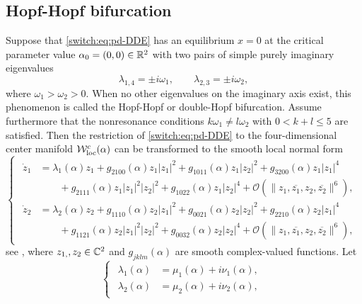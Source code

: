 \subsection{Hopf-Hopf bifurcation}
\label{switch:sec:HH_coef}
Suppose that \cref{switch:eq:pd-DDE} has an equilibrium $x=0$ at the critical parameter value $\alpha_{0}=(0,0)\in \mathbb{R}^{2}$ with two pairs of simple purely imaginary eigenvalues
\begin{equation}
  \label{switch:eq:HH_eigenvalues}
\lambda_{1,4}=\pm i\omega_{1},\qquad\lambda_{2,3}=\pm i\omega_{2},
\end{equation}
where $\omega_{1}>\omega_{2}>0$. When no other eigenvalues on the imaginary axis exist, this phenomenon is called the Hopf-Hopf or double-Hopf bifurcation. Assume furthermore that the nonresonance conditions $k\omega_{1}\neq l\omega_{2}$ with $0 < k+l \leq 5$ are satisfied. Then the restriction of \cref{switch:eq:pd-DDE} to the four-dimensional center manifold $\mathcal{W}^c_{\text{loc}}(\alpha)$ can be transformed to the smooth local normal form
\begin{equation*}
\begin{cases}
\begin{aligned}
\dot{z}_{1} & =\lambda_{1}(\alpha)z_{1}+g_{2100}(\alpha)z_{1}|z_{1}|^{2}+g_{1011}(\alpha)z_{1}|z_{2}|^{2}+g_{3200}(\alpha)z_{1}|z_{1}|^{4}\\
 & \qquad+g_{2111}(\alpha)z_{1}|z_{1}|^{2}|z_{2}|^{2}+g_{1022}(\alpha)z_{1}|z_{2}|^{4}+\mathcal{O}\left(\|z_{1},\overline{z_{1}},z_{2},\overline{z_{2}}\|^{6}\right),\\
\dot{z}_{2} & =\lambda_{2}(\alpha)z_{2}+g_{1110}(\alpha)z_{2}|z_{1}|^{2}+g_{0021}(\alpha)z_{2}|z_{2}|^{2}+g_{2210}(\alpha)z_{2}|z_{1}|^{4}\\
 & \qquad+g_{1121}(\alpha)z_{2}|z_{1}|^{2}|z_{2}|^{2}+g_{0032}(\alpha)z_{2}|z_{2}|^{4}+\mathcal{O}\left(\|z_{1},\overline{z_{1}},z_{2},\overline{z_{2}}\|^{6}\right),
\end{aligned}
\end{cases}\label{switch:eq:HH_nf}
\end{equation*}
see \cite[\S 8.6, Lemma 8.13]{Kuznetsov2004}, where $z_{1,},z_{2}\in \mathbb{C}^{2}$ and $g_{jklm}(\alpha)$ are smooth complex-valued functions.
Let
\[
\begin{cases}
\begin{aligned}
\lambda_{1}(\alpha) & =\mu_{1}(\alpha)+i\nu_{1}(\alpha),\\
\lambda_{2}(\alpha) & =\mu_{2}(\alpha)+i\nu_{2}(\alpha),
\end{aligned}
\end{cases}
\]
